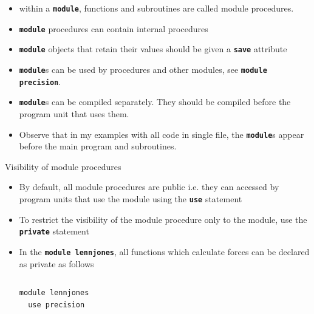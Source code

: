 \documentclass[slidestop,mathserif,compress,xcolor=svgnames]{beamer}
\newenvironment{eblock}[0]
{
\begin{beamerboxesrounded}[upper=uppercol2,lower=lowercol2,shadow=true]}
{\end{beamerboxesrounded}}
\begin{document}
\begin{frame}
  \begin{itemize}
    \item within a \textbf{\texttt{module}}, functions and subroutines are called module procedures.
    \item \textbf{\texttt{module}} procedures can contain internal procedures
    \item \textbf{\texttt{module}} objects that retain their values should be given a \textbf{\texttt{save}} attribute
    \item \textbf{\texttt{module}}s can be used by procedures and other modules, see \textbf{\texttt{module precision}}.
    \item \textbf{\texttt{module}}s can be compiled separately. {\color{red}They should be compiled before the program unit that uses them}.
    \item[] Observe that in my examples with all code in single file, the \textbf{\texttt{module}}s appear before the main program and subroutines.
  \end{itemize}

  \begin{block}{\scriptsize Visibility of module procedures}
    \begin{itemize}
      \item By default, all module procedures are public i.e. they can accessed by program units that use the module using the \textbf{\texttt{use}} statement
      \item To restrict the visibility of the module procedure only to the module, use the \textbf{\texttt{private}} statement
      \item In the \textbf{\texttt{module lennjones}}, all functions which calculate forces can be declared as private as follows
      \begin{columns}
        \column{5cm}
        \begin{eblock}{}
          {\fontsize{4}{5}
          \begin{verbatim}
module lennjones
  use precision


\end{verbatim}}
\end{eblock}
\end{columns}
\end{itemize}
\end{block}
\end{frame}
\end{document}
